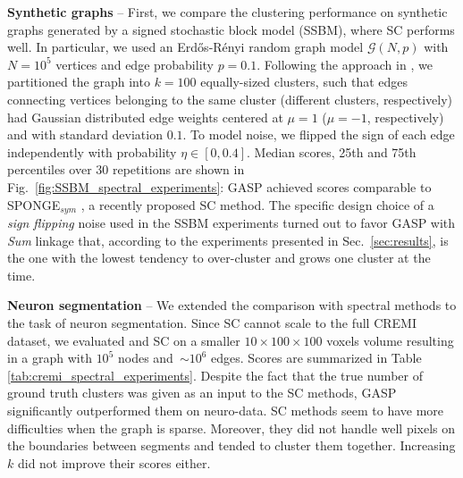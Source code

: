 \textbf{Synthetic graphs} -- First, we compare the clustering performance on synthetic graphs generated by a signed stochastic block model (SSBM), where SC performs well. In particular, we used an Erd\H os-R\'enyi random graph model $\mathcal{G}(N,p)$ with $N=10^5$ vertices and edge probability $p=0.1$. Following the approach in \cite{Cucuringu2019SPONGEAG}, we partitioned the graph into $k=100$ equally-sized clusters, such that edges connecting vertices belonging to the same cluster (different clusters, respectively) had Gaussian distributed edge weights centered at $\mu=1$ ($\mu=-1$, respectively) and with standard deviation $0.1$. To model noise, we flipped the sign of each edge independently with probability $\eta \in [0, 0.4]$. Median scores, 25th and 75th percentiles over 30 repetitions are shown in Fig.~\ref{fig:SSBM_spectral_experiments}: GASP achieved scores comparable to SPONGE$_{sym}$ \cite{Cucuringu2019SPONGEAG}, a recently proposed SC method. The specific design choice of a \emph{sign flipping} noise used in the SSBM experiments turned out to favor GASP with \emph{Sum} linkage that, according to the experiments presented in Sec.~\ref{sec:results}, is the one with the lowest tendency to over-cluster and grows one cluster at the time.

\textbf{Neuron segmentation} -- We extended the comparison with spectral methods to the task of neuron segmentation. Since SC cannot scale to the full CREMI dataset, we evaluated \algname{} and SC on a smaller $10\times100\times100$ voxels volume resulting in a graph with $10^5$ nodes and~$\sim10^6$ edges. Scores are summarized in Table \ref{tab:cremi_spectral_experiments}.
Despite the fact that the true number of ground truth clusters was given as an input to the SC methods, GASP significantly outperformed them on neuro-data. SC methods seem to have more difficulties when the graph is sparse. Moreover, they did not handle well pixels on the boundaries between segments and tended to cluster them together. Increasing $k$ did not improve their scores either.


